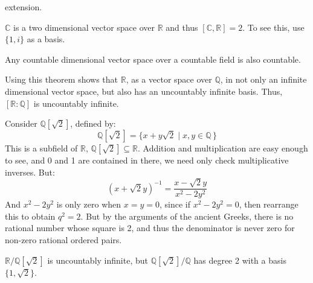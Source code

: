\documentclass{article}                                                        %
\begin{document}
            extension.
            \begin{example}
                $\mathbb{C}$ is a two dimensional vector space over $\mathbb{R}$
                and thus $[\mathbb{C},\mathbb{R}]=2$. To see this, use
                $\{1,i\}$ as a basis.
            \end{example}
            \begin{theorem}
                Any countable dimensional vector space over a countable field is
                also countable.
            \end{theorem}
            \begin{example}
                Using this theorem shows that $\mathbb{R}$, as a vector space
                over $\mathbb{Q}$, in not only an infinite dimensional vector
                space, but also has an uncountably infinite basis.
                Thus, $[\mathbb{R}:\mathbb{Q}]$ is uncountably infinite.
            \end{example}
            \begin{example}
                Consider $\mathbb{Q}[\sqrt{2}]$, defined by:
                \begin{equation}
                    \mathbb{Q}[\sqrt{2}]=\{x+y\sqrt{2}\;|\;x,y\in\mathbb{Q}\,\}
                \end{equation}
                This is a subfield of $\mathbb{R}$,
                $\mathbb{Q}[\sqrt{2}]\subseteq\mathbb{R}$. Addition and
                multiplication are easy enough to see, and 0 and 1 are contained
                in there, we need only check multiplicative inverses. But:
                \begin{equation}
                    (x+\sqrt{2}y)^{\minus{1}}=\frac{x-\sqrt{2}y}{x^{2}-2y^{2}}
                \end{equation}
                And $x^{2}-2y^{2}$ is only zero when $x=y=0$, since if
                $x^{2}-2y^{2}=0$, then rearrange this to obtain $q^{2}=2$. But
                by the arguments of the ancient Greeks, there is no rational
                number whose square is 2, and thus the denominator is never
                zero for non-zero rational ordered pairs.
            \end{example}
            \begin{example}
                $\mathbb{R}/\mathbb{Q}[\sqrt{2}]$ is uncountably infinite, but
                $\mathbb{Q}[\sqrt{2}]/\mathbb{Q}$ has degree 2 with a basis
                $\{1,\sqrt{2}\}$.
            \end{example}
\end{document}
